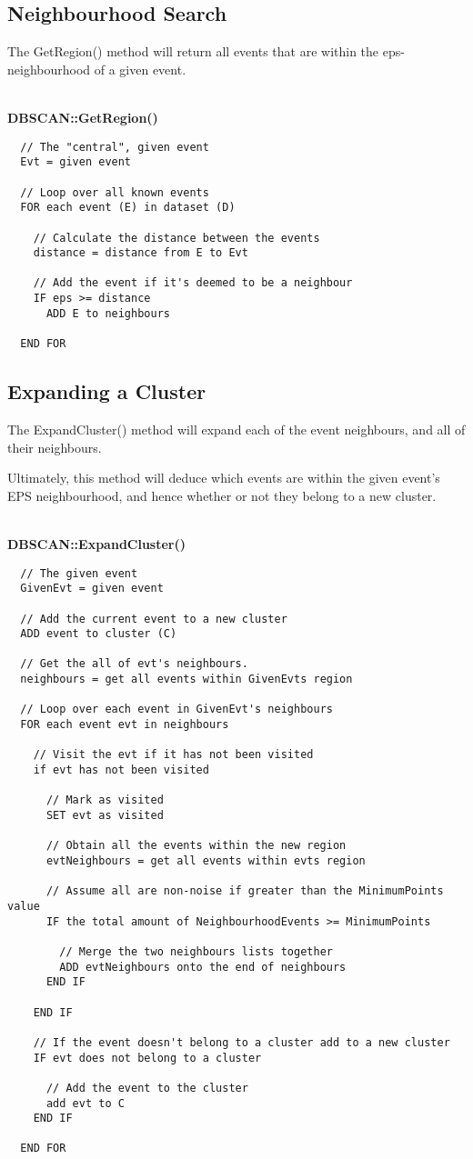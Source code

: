 \subsection{Neighbourhood Search}
The {\ttfamily GetRegion()} method will return all events that are within the 
eps-neighbourhood of a given event.

~\\
{\bfseries DBSCAN::GetRegion()}
\lstset{style=pseudocode}
\begin{lstlisting}
  // The "central", given event
  Evt = given event
  
  // Loop over all known events
  FOR each event (E) in dataset (D)

    // Calculate the distance between the events
    distance = distance from E to Evt

    // Add the event if it's deemed to be a neighbour
    IF eps >= distance
      ADD E to neighbours

  END FOR
\end{lstlisting}


\subsection{Expanding a Cluster}
The {\ttfamily ExpandCluster()} method will expand each of the event 
neighbours, and all of their neighbours. 

Ultimately, this method will deduce which events are within the given event's 
EPS neighbourhood, and hence whether or not they belong to a new cluster.

~\\
{\bfseries DBSCAN::ExpandCluster()}
\lstset{style=pseudocode}
\begin{lstlisting}
  // The given event
  GivenEvt = given event

  // Add the current event to a new cluster
  ADD event to cluster (C)

  // Get the all of evt's neighbours.
  neighbours = get all events within GivenEvts region

  // Loop over each event in GivenEvt's neighbours
  FOR each event evt in neighbours

    // Visit the evt if it has not been visited
    if evt has not been visited

      // Mark as visited
      SET evt as visited
      
      // Obtain all the events within the new region
      evtNeighbours = get all events within evts region

      // Assume all are non-noise if greater than the MinimumPoints value
      IF the total amount of NeighbourhoodEvents >= MinimumPoints

        // Merge the two neighbours lists together
        ADD evtNeighbours onto the end of neighbours
      END IF

    END IF

    // If the event doesn't belong to a cluster add to a new cluster
    IF evt does not belong to a cluster

      // Add the event to the cluster
      add evt to C
    END IF

  END FOR
\end{lstlisting}